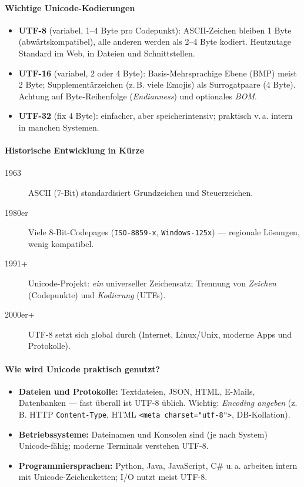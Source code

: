 \documentclass[12pt,a4paper]{book}
\begin{document}
\paragraph{Wichtige Unicode-Kodierungen}
\begin{itemize}
	\item \textbf{UTF-8} (variabel, 1–4 Byte pro Codepunkt): ASCII-Zeichen bleiben 1 Byte (abwärtskompatibel), alle anderen werden als 2–4 Byte kodiert. Heutzutage Standard im Web, in Dateien und Schnittstellen.
	\item \textbf{UTF-16} (variabel, 2 oder 4 Byte): Basis-Mehrsprachige Ebene (BMP) meist 2 Byte; Supplementärzeichen (z.\,B. viele Emojis) als Surrogatpaare (4 Byte). Achtung auf Byte-Reihenfolge (\emph{Endianness}) und optionales \emph{BOM}.
	\item \textbf{UTF-32} (fix 4 Byte): einfacher, aber speicherintensiv; praktisch v.\,a. intern in manchen Systemen.
\end{itemize}

\paragraph{Historische Entwicklung in Kürze}
\begin{description}
	\item[1963] ASCII (7-Bit) standardisiert Grundzeichen und Steuerzeichen.
	\item[1980er] Viele 8-Bit-Codepages (\texttt{ISO-8859-x}, \texttt{Windows-125x}) — regionale Lösungen, wenig kompatibel.
	\item[1991+] Unicode-Projekt: \emph{ein} universeller Zeichensatz; Trennung von \emph{Zeichen} (Codepunkte) und \emph{Kodierung} (UTFs).
	\item[2000er+] UTF-8 setzt sich global durch (Internet, Linux/Unix, moderne Apps und Protokolle).
\end{description}

\paragraph{Wie wird Unicode praktisch genutzt?}
\begin{itemize}
	\item \textbf{Dateien und Protokolle:} Textdateien, JSON, HTML, E-Mails, Datenbanken — fast überall ist UTF-8 üblich. Wichtig: \emph{Encoding angeben} (z.\,B. HTTP \texttt{Content-Type}, HTML \texttt{<meta charset="utf-8">}, DB-Kollation).
	\item \textbf{Betriebssysteme:} Dateinamen und Konsolen sind (je nach System) Unicode-fähig; moderne Terminals verstehen UTF-8.
	\item \textbf{Programmiersprachen:} Python, Java, JavaScript, C\# u.\,a. arbeiten intern mit Unicode-Zeichenketten; I/O nutzt meist UTF-8.
\end{itemize}
\end{document}
